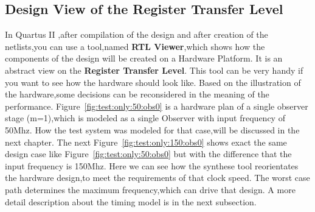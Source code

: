 \subsection{Design View of the Register Transfer Level}
In Quartus II ,after compilation of the design and after creation of the netlists,you can use a tool,named \textbf{RTL Viewer},which shows how
the components of the design will be created on a Hardware Platform. It is an abstract view on the \textbf{Register Transfer Level}.
This tool can be very handy if you want to see how the hardware should look like. Based on the illustration of the hardware,some decisions can
be reconsidered in the meaning of the performance. \newline
Figure~\ref{fig:test:only:50:obs0} is a hardware plan of a single observer stage (m=1),which is modeled as a single Observer with input frequency of 50Mhz.
How the test system was modeled for that case,will be discussed in the next chapter.
The next Figure~\ref{fig:test:only:150:obs0} shows exact the same design case like Figure~\ref{fig:test:only:50:obs0} but with the difference that the input frequency is 150Mhz.
Here we can see how the synthese tool reorientates the hardware design,to meet the requirements of that clock speed. The worst case path determines the maximum frequency,which can drive
that design. 
A more detail description about the timing model is in the next subsection.
